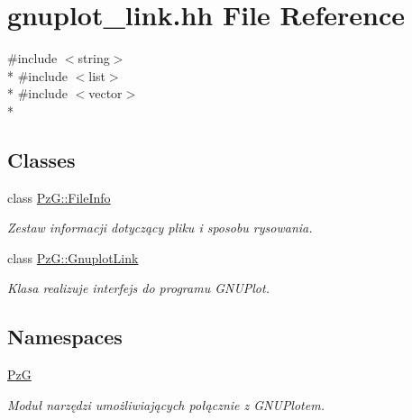 \hypertarget{gnuplot__link_8hh}{}\section{gnuplot\+\_\+link.\+hh File Reference}
\label{gnuplot__link_8hh}
{\ttfamily \#include $<$string$>$}\\*
{\ttfamily \#include $<$list$>$}\\*
{\ttfamily \#include $<$vector$>$}\\*
\subsection*{Classes}
\begin{DoxyCompactItemize}
\item 
class \hyperlink{class_pz_g_1_1_file_info}{Pz\+G\+::\+File\+Info}
\begin{DoxyCompactList}\small\item\em Zestaw informacji dotyczący pliku i sposobu rysowania. \end{DoxyCompactList}\item 
class \hyperlink{class_pz_g_1_1_gnuplot_link}{Pz\+G\+::\+Gnuplot\+Link}
\begin{DoxyCompactList}\small\item\em Klasa realizuje interfejs do programu G\+N\+U\+Plot. \end{DoxyCompactList}\end{DoxyCompactItemize}
\subsection*{Namespaces}
\begin{DoxyCompactItemize}
\item 
 \hyperlink{namespace_pz_g}{PzG}
\begin{DoxyCompactList}\small\item\em Moduł narzędzi umożliwiających połącznie z G\+N\+U\+Plotem. \end{DoxyCompactList}\end{DoxyCompactItemize}
